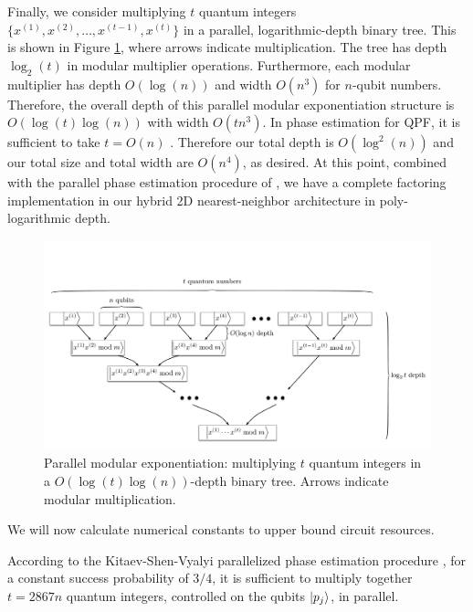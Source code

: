 Finally, we consider multiplying $t$ quantum integers
$\{x^{(1)}, x^{(2)}, \ldots, x^{(t-1)}, x^{(t)}\}$ in a parallel,
logarithmic-depth binary tree.
This is shown in Figure \ref{fig:modexp-qq-parallel}, where arrows indicate multiplication.
The tree has depth $\log_2(t)$ in modular multiplier operations. Furthermore,
each
modular multiplier has depth $O(\log(n))$ and width $O(n^3)$ for $n$-qubit
numbers. Therefore, the overall depth of this parallel modular exponentiation
structure is $O(\log(t)\log(n))$ with width $O(tn^3)$.
In phase estimation for QPF, it is
sufficient to take $t = O(n)$ \cite{Nielsen2000,Kitaev2002}. Therefore our total depth is
$O(\log^2(n))$ and our total size and total width are $O(n^4)$, as desired. At this point, combined with the parallel phase
estimation procedure of \cite{Kitaev2002}, we have a complete factoring
implementation in our hybrid 2D nearest-neighbor architecture in poly-logarithmic
depth.
%
\begin{figure}[tb!]
\centerline{
\includegraphics[width=5.5in]{factor-polylog/figures/mod-exp-par.pdf}
}
\caption[Parallel modular exponentiation]
{Parallel modular exponentiation: multiplying $t$ quantum integers
in a $O(\log{(t)}\log{(n)})$-depth binary tree. Arrows indicate modular
multiplication.}
\label{fig:modexp-qq-parallel}
\end{figure}

We will now calculate numerical
constants to upper bound circuit resources.

According to the Kitaev-Shen-Vyalyi parallelized phase estimation procedure
\cite{Kitaev2002},
for a constant success probability of $3/4$,
it is sufficient to multiply together $t = 2867n$ quantum integers,
controlled on the qubits $\left\vert{p_j}\right\rangle$, in parallel.

